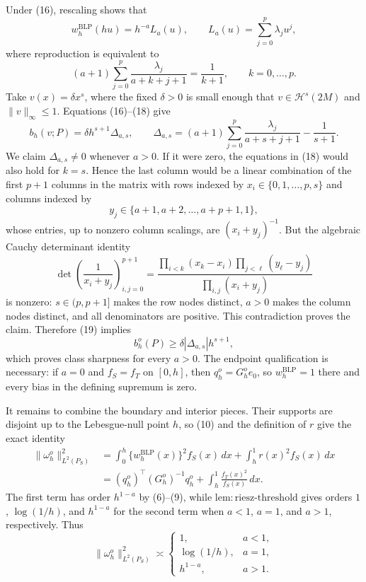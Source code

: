 Under (16), rescaling shows that
\[
w_h^{\mathrm{BLP}}(hu)=h^{-a}L_a(u),
\qquad
L_a(u)=\sum_{j=0}^p\lambda_ju^j,
\tag{17}
\]
where reproduction is equivalent to
\[
(a+1)\sum_{j=0}^p\frac{\lambda_j}{a+k+j+1}=\frac1{k+1},
\qquad k=0,\ldots,p.
\tag{18}
\]
Take \(v(x)=\delta x^s\), where the fixed \(\delta>0\) is small enough that
\(v\in\mathcal H^s(2M)\) and \(\|v\|_\infty\le1\). Equations (16)--(18) give
\[
b_h(v;P)=\delta h^{s+1}\Delta_{a,s},
\qquad
\Delta_{a,s}=(a+1)\sum_{j=0}^p\frac{\lambda_j}{a+s+j+1}-\frac1{s+1}.
\tag{19}
\]
We claim \(\Delta_{a,s}\ne0\) whenever \(a>0\). If it were zero, the equations in (18) would also hold for \(k=s\). Hence the last column would be a linear combination of the first \(p+1\) columns in the matrix with rows indexed by \(x_i\in\{0,1,\ldots,p,s\}\) and columns indexed by
\[
y_j\in\{a+1,a+2,\ldots,a+p+1,1\},
\]
whose entries, up to nonzero column scalings, are \((x_i+y_j)^{-1}\). But the algebraic Cauchy determinant identity
\[
\det\left(\frac1{x_i+y_j}\right)_{i,j=0}^{p+1}
=
\frac{\prod_{i<k}(x_k-x_i)\prod_{j<\ell}(y_\ell-y_j)}
{\prod_{i,j}(x_i+y_j)}
\tag{20}
\]
is nonzero: \(s\in(p,p+1]\) makes the row nodes distinct, \(a>0\) makes the column nodes distinct, and all denominators are positive. This contradiction proves the claim. Therefore (19) implies
\[
b_h^o(P)\ge\delta|\Delta_{a,s}|h^{s+1},
\tag{21}
\]
which proves class sharpness for every \(a>0\). The endpoint qualification is necessary: if \(a=0\) and \(f_S=f_T\) on \([0,h]\), then \(q_h^o=G_h^oe_0\), so \(w_h^{\mathrm{BLP}}=1\) there and every bias in the defining supremum is zero.

It remains to combine the boundary and interior pieces. Their supports are disjoint up to the Lebesgue-null point \(h\), so (10) and the definition of \(r\) give the exact identity
\[
\begin{aligned}
\|\omega_h^o\|_{L^2(P_S)}^2
&=\int_0^h\{w_h^{\mathrm{BLP}}(x)\}^2f_S(x)\,dx
  +\int_h^1r(x)^2f_S(x)\,dx\\
&=(q_h^o)^\top(G_h^o)^{-1}q_h^o
  +\int_h^1\frac{f_T(x)^2}{f_S(x)}\,dx.
\end{aligned}
\tag{22}
\]
The first term has order \(h^{1-a}\) by (6)--(9), while
\(\mathrm{lem:riesz\text{-}threshold}\) gives orders \(1\), \(\log(1/h)\), and
\(h^{1-a}\) for the second term when \(a<1\), \(a=1\), and \(a>1\), respectively. Thus
\[
\|\omega_h^o\|_{L^2(P_S)}^2\asymp
\begin{cases}
1,&a<1,\\
\log(1/h),&a=1,\\
h^{1-a},&a>1.
\end{cases}
\tag{23}
\]

